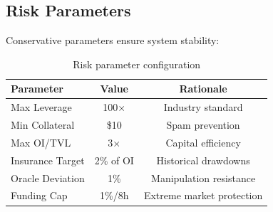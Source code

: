 \subsection{Risk Parameters}

Conservative parameters ensure system stability:

\begin{table}[h]
\centering
\begin{tabular}{|l|c|c|}
\hline
\textbf{Parameter} & \textbf{Value} & \textbf{Rationale} \\
\hline
Max Leverage & 100$\times$ & Industry standard \\
Min Collateral & \$10 & Spam prevention \\
Max OI/TVL & 3$\times$ & Capital efficiency \\
Insurance Target & 2\% of OI & Historical drawdowns \\
Oracle Deviation & 1\% & Manipulation resistance \\
Funding Cap & 1\%/8h & Extreme market protection \\
\hline
\end{tabular}
\caption{Risk parameter configuration}
\end{table}

